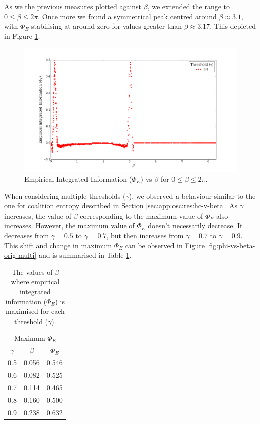 \documentclass[a4paper,11pt]{article}
\begin{document}
As we the previous measures plotted against $\beta$, we extended the range to $0 \leq \beta \leq 2\pi$. Once more we found a symmetrical peak centred around $\beta \approx 3.1$, with $\Phi_E$ stabilising at around zero for values greater than $\beta \approx 3.17$. This depicted in Figure \ref{fig:phi-vs-beta-ext}.

\begin{figure}[H]
\begin{center}
\includegraphics[scale = 0.35]{figures/phi_vs_beta_ext}
\caption{
	Empirical Integrated Information ($\Phi_E$) vs $\beta$ for $0 \leq \beta \leq 2\pi$.
	\label{fig:phi-vs-beta-ext}
}
\end{center}
\end{figure}


When considering multiple thresholds ($\gamma$), we observed a behaviour similar to the one for coalition entropy described in Section \ref{sec:app:osc:res:hc-v-beta}. As $\gamma$ increases, the value of $\beta$ corresponding to the maximum value of $\Phi_E$ also increases. However, the maximum value of $\Phi_E$ doesn't necessarily decrease. It decreases from $\gamma = 0.5$ to $\gamma = 0.7$, but then increases from $\gamma = 0.7$ to $\gamma = 0.9$. This shift and change in maximum $\Phi_E$ can be observed in Figure \ref{fig:phi-vs-beta-orig-multi} and is summarised in Table \ref{tab:max-phi-beta}.

\begin{table}[ht]
\centering
\begin{tabular}{ c | c c }
\multicolumn{3}{c}{Maximum $\Phi_E$} \\ [2mm]
$\gamma$ & $\beta$ & $\Phi_E$\\
\hline
0.5 & 0.056 & 0.546 \\
0.6 & 0.082 & 0.525 \\
0.7 & 0.114 & 0.465 \\
0.8 & 0.160 & 0.500 \\
0.9 & 0.238 & 0.632 \\
\end{tabular}
\caption{
	The values of $\beta$ where empirical integrated information ($\Phi_E$) is maximised for each threshold ($\gamma$).
	\label{tab:max-phi-beta}
}
\end{table}
\end{document}
